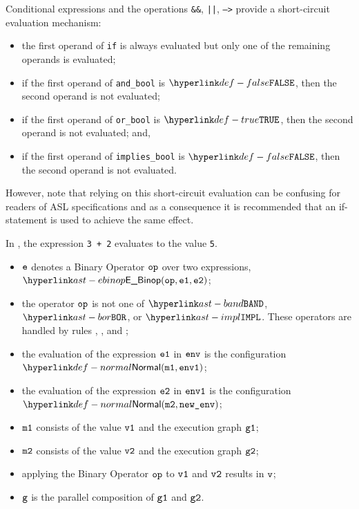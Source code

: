 
Conditional expressions and the operations \texttt{\&\&}, \texttt{||},
\texttt{-->} provide a short-circuit evaluation mechanism:

\begin{itemize}
\item the first operand of \texttt{if} is always evaluated but only one of the
remaining operands is evaluated;
\item if the first operand of \texttt{and\_bool} is $\False$, then the second operand is not evaluated;
\item if the first operand of \texttt{or\_bool} is $\True$, then the second operand is not evaluated; and,
\item if the first operand of \texttt{implies\_bool} is $\False$, then the
second operand is not evaluated.
\end{itemize}

However, note that relying on this short-circuit evaluation can be confusing
for readers of ASL specifications and as a consequence it is recommended that
an if-statement is used to achieve the same effect.

\hypertarget{def-binopexpressionterm}{}
In ,
the expression \texttt{3 + 2} evaluates to the value \texttt{5}.

\ProseParagraph
\AllApply
\begin{itemize}
  \item $\texttt{e}$ denotes a Binary Operator $\texttt{op}$ over two expressions, $\EBinop(\op, \veone, \vetwo)$;
  \item the operator $\texttt{op}$ is not one of $\BAND$, $\BOR$, or $\IMPL$.
        These operators are handled by rules
        ,
        , and
        ;
  \item the evaluation of the expression $\texttt{e1}$ in $\texttt{env}$ is the configuration \\
        $\Normal(\vmone, \envone)$\ProseOrAbnormal;
  \item the evaluation of the expression $\texttt{e2}$ in $\texttt{env1}$ is the configuration \\
        $\Normal(\vmtwo, \newenv)$\ProseOrAbnormal;
  \item $\texttt{m1}$ consists of the value $\texttt{v1}$ and the execution graph $\texttt{g1}$;
  \item $\texttt{m2}$ consists of the value $\texttt{v2}$ and the execution graph $\texttt{g2}$;
  \item applying the Binary Operator $\texttt{op}$ to $\texttt{v1}$ and $\texttt{v2}$ results in $\texttt{v}$\ProseOrError;
  \item $\texttt{g}$ is the parallel composition of $\texttt{g1}$ and $\texttt{g2}$.
\end{itemize}

